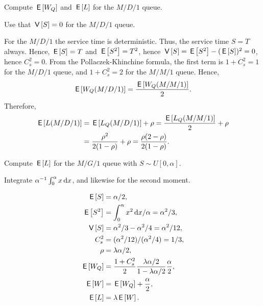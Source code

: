 \documentclass[companion]{subfiles}
\begin{document}
\begin{extra}
 Compute $\,\mathsf{E}\left[W_Q\right]$ and $\,\mathsf{E}\left[L\right]$ for the $M/D/1$ queue.
\begin{hint}
Use that $\,\mathsf{V}\left[S\right]=0$ for the $M/D/1$ queue.    
\end{hint}
\begin{solution}
 For the $M/D/1$ the service time is deterministic.
 Thus, the service time $S=T$ always.
 Hence, $\,\mathsf{E}\left[S\right] = T$ and $\,\mathsf{E}\left[S^2\right]=T^2$, hence $\,\mathsf{V}\left[S\right] = \,\mathsf{E}\left[S^2\right] - (\,\mathsf{E}\left[S\right])^2 = 0$, hence $C_s^2 = 0$.
 From the Pollaczek-Khinchine formula, the first term is $1+C_s^2=1$ for the $M/D/1$ queue, and $1+C_s^2=2$ for the $M/M/1$ queue.
 Hence,
 \begin{equation*}
\,\mathsf{E}\left[W_Q(M/D/1)\right] = \frac{\,\mathsf{E}\left[W_Q(M/M/1)\right]}2.
\end{equation*}
Therefore,
\begin{align*}
 \,\mathsf{E}\left[L(M/D/1)\right] &= \,\mathsf{E}\left[L_Q(M/D/1)\right] +\rho = \frac{\,\mathsf{E}\left[L_Q(M/M/1)\right]}2 + \rho \\
&= \frac{\rho^2}{2(1-\rho)} + \rho=\frac{\rho(2-\rho)} {2(1-\rho)}.
\end{align*}
\end{solution}
\end{extra}

\begin{extra}
 Compute $\,\mathsf{E}\left[L\right]$ for the $M/G/1$ queue with $S\sim U[0,\alpha]$.
\begin{hint}
Integrate $\alpha^{-1} \int_0^\alpha x \,\text{d}x$, and likewise for the second moment.
\end{hint}
\begin{solution}
 \begin{align*}
\,\mathsf{E}\left[S\right] &= \alpha/2,\\
\,\mathsf{E}\left[S^2\right] &= \int_0^\alpha x^2 \,\text{d}x/\alpha = \alpha^2/3,\\
\,\mathsf{V}\left[S\right] &= \alpha^2/3 - \alpha^2/4= \alpha^2/12,\\
C_s^2 &= (\alpha^2/12)/(\alpha^2/4) = 1/3,\\
\rho &= \lambda \alpha/2,\\
\,\mathsf{E}\left[W_Q\right] &= \frac{1+C_s^2}2 \frac{\lambda \alpha/2}{1-\lambda \alpha/2}\frac \alpha2, \\
\,\mathsf{E}\left[W\right] &= \,\mathsf{E}\left[W_Q\right] + \frac \alpha2,\\
\,\mathsf{E}\left[L\right] &= \lambda \,\mathsf{E}\left[W\right].
 \end{align*}
\end{solution}
\end{extra}
\end{document}
